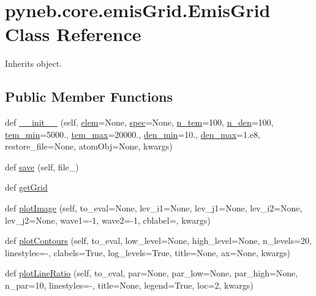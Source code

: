 \hypertarget{classpyneb_1_1core_1_1emis_grid_1_1_emis_grid}{}\section{pyneb.\+core.\+emis\+Grid.\+Emis\+Grid Class Reference}
\label{classpyneb_1_1core_1_1emis_grid_1_1_emis_grid}


Inherits object.

\subsection*{Public Member Functions}
\begin{DoxyCompactItemize}
\item 
def \hyperlink{classpyneb_1_1core_1_1emis_grid_1_1_emis_grid_a39c57fa6ec1619540d588cded7bbce9c}{\+\_\+\+\_\+init\+\_\+\+\_\+} (self, \hyperlink{classpyneb_1_1core_1_1emis_grid_1_1_emis_grid_a860a236b0e426b4671071e4bf492dee7}{elem}=None, \hyperlink{classpyneb_1_1core_1_1emis_grid_1_1_emis_grid_a78618aff86ea296ecefddcc86d98b687}{spec}=None, \hyperlink{classpyneb_1_1core_1_1emis_grid_1_1_emis_grid_a7a86bfc0cd3ed0d14ccaf950fb183696}{n\+\_\+tem}=100, \hyperlink{classpyneb_1_1core_1_1emis_grid_1_1_emis_grid_a6e0bddbe2d14b13fe1270a74b5b9ac0c}{n\+\_\+den}=100, \hyperlink{classpyneb_1_1core_1_1emis_grid_1_1_emis_grid_abd8712ac536b051f866429da43f526de}{tem\+\_\+min}=5000., \hyperlink{classpyneb_1_1core_1_1emis_grid_1_1_emis_grid_a2d0eacad9eb4fa87ef08d1f710cf2317}{tem\+\_\+max}=20000., \hyperlink{classpyneb_1_1core_1_1emis_grid_1_1_emis_grid_a15ba80aa398cebb3178d75c8dd5a7e32}{den\+\_\+min}=10., \hyperlink{classpyneb_1_1core_1_1emis_grid_1_1_emis_grid_abd2b718af1e50d5c640e5fbb881c02f9}{den\+\_\+max}=1.e8, restore\+\_\+file=None, atom\+Obj=None, kwargs)
\item 
def \hyperlink{classpyneb_1_1core_1_1emis_grid_1_1_emis_grid_a72fa9f1f48e7f9de7f2ec196ce63cf3e}{save} (self, file\+\_\+)
\item 
def \hyperlink{classpyneb_1_1core_1_1emis_grid_1_1_emis_grid_af9a9219e5ddfcfd53c52466e2c2deb44}{get\+Grid}
\item 
def \hyperlink{classpyneb_1_1core_1_1emis_grid_1_1_emis_grid_acc7005176ce79eb13fdca3ff1607d6e8}{plot\+Image} (self, to\+\_\+eval=None, lev\+\_\+i1=None, lev\+\_\+j1=None, lev\+\_\+i2=None, lev\+\_\+j2=None, wave1=-\/1, wave2=-\/1, cblabel=\textquotesingle{}\textquotesingle{}, kwargs)
\item 
def \hyperlink{classpyneb_1_1core_1_1emis_grid_1_1_emis_grid_ad9b2a66903f1b2e6b711c7d6dbe37dba}{plot\+Contours} (self, to\+\_\+eval, low\+\_\+level=None, high\+\_\+level=None, n\+\_\+levels=20, linestyles=\textquotesingle{}-\/\textquotesingle{}, clabels=True, log\+\_\+levels=True, title=None, ax=None, kwargs)
\item 
def \hyperlink{classpyneb_1_1core_1_1emis_grid_1_1_emis_grid_a26aabc41fbb077d204e64f379e5ec5f7}{plot\+Line\+Ratio} (self, to\+\_\+eval, par=None, par\+\_\+low=None, par\+\_\+high=None, n\+\_\+par=10, linestyles=\textquotesingle{}-\/\textquotesingle{}, title=None, legend=True, loc=2, kwargs)
\end{DoxyCompactItemize}
